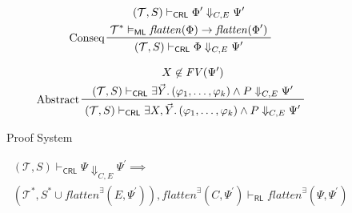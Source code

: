 \documentclass{article}
\newcommand{\RL}{\mathsf{RL}}
\newcommand{\ML}{\mathsf{ML}}
\newcommand{\CRL}{\mathsf{CRL}}
\begin{document}
\begin{figure}
\begin{align*}
    & \prftree[l]{Conseq}
      { \prfStackPremises
        { (\mathcal{T}, S) \vdash_\CRL \Phi^\prime \Downarrow_{C, E} \Psi^\prime}
        { \mathcal{T}^* \vDash_\ML \mathit{flatten}(\Phi) \rightarrow \mathit{flatten}(\Phi^\prime) }
      }
      { (\mathcal{T}, S) \vdash_\CRL \Phi \Downarrow_{C, E} \Psi^\prime}
    \end{align*}

    
    \begin{align*}
    & \prftree[l]{Abstract}
      { \prfStackPremises
        { X \not\in \mathit{FV}(\Psi^\prime)
        }
        {(\mathcal{T}, S) \vdash_\CRL \exists \vec{Y}.\, (\varphi_1, \ldots, \varphi_k) \land P \Downarrow_{C, E} \Psi^\prime}
      }
      {(\mathcal{T}, S) \vdash_\CRL \exists X, \vec{Y}.\, (\varphi_1, \ldots, \varphi_k) \land P \Downarrow_{C, E} \Psi^\prime}
    \end{align*}
    \caption{Proof System}
    \label{fig:my_label}
\end{figure}



\begin{lemma}\label{lem:CRLalmostSoundness}
    \begin{align*}
        & (\mathcal{T}, S) \vdash_\CRL \Psi \Downarrow_{C,E} \Psi^\prime \implies \\
        &
        (\mathcal{T}^*, S^* \cup \mathit{flatten}^\exists(E, \Psi^\prime)), \mathit{flatten}^\exists(C, \Psi^\prime) \vdash_\RL
          \mathit{flatten}^\exists(\Psi, \Psi^\prime) 
    \end{align*}
\end{lemma}
\end{document}
